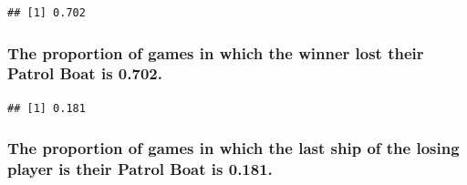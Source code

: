 \documentclass[
]{article}
\newenvironment{Shaded}{\begin{snugshade}}{\end{snugshade}}
\newcommand{\CommentTok}[1]{\textcolor[rgb]{0.56,0.35,0.01}{\textit{#1}}}
\newcommand{\ControlFlowTok}[1]{\textcolor[rgb]{0.13,0.29,0.53}{\textbf{#1}}}
\newcommand{\DecValTok}[1]{\textcolor[rgb]{0.00,0.00,0.81}{#1}}
\newcommand{\FunctionTok}[1]{\textcolor[rgb]{0.13,0.29,0.53}{\textbf{#1}}}
\newcommand{\NormalTok}[1]{#1}
\newcommand{\OtherTok}[1]{\textcolor[rgb]{0.56,0.35,0.01}{#1}}
\newcommand{\SpecialCharTok}[1]{\textcolor[rgb]{0.81,0.36,0.00}{\textbf{#1}}}
\begin{document}
\begin{verbatim}
## [1] 0.702
\end{verbatim}

\subsubsection{The proportion of games in which the winner lost their
Patrol Boat is
0.702.}\label{the-proportion-of-games-in-which-the-winner-lost-their-patrol-boat-is-0.702.}

\begin{Shaded}
\end{Shaded}

\begin{verbatim}
## [1] 0.181
\end{verbatim}

\subsubsection{The proportion of games in which the last ship of the
losing player is their Patrol Boat is
0.181.}\label{the-proportion-of-games-in-which-the-last-ship-of-the-losing-player-is-their-patrol-boat-is-0.181.}
\end{document}
